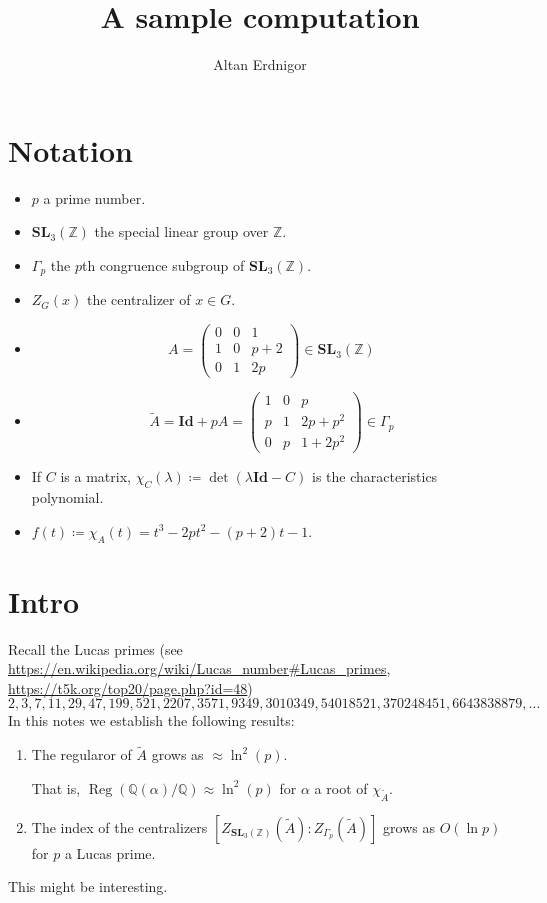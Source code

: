 \documentclass[a4paper]{article}
\DeclareMathOperator{\assign}{\coloneqq}        %
\newcommand{\Q}{\mathbb{Q}}        %
\newcommand{\Id}{\mathbf{Id}}        %
\newcommand{\SL}{\mathbf{SL}_3(\mathbb{Z})}        %
\newcommand{\SLp}{\Gamma_p}        %
\DeclareMathOperator{\Reg}{Reg}        %
\begin{document}
\title{A sample computation}	
\author{Altan Erdnigor}
\maketitle

\section{Notation}
\begin{itemize}
\item $p$ a prime number.
\item $\SL$ the special linear group over $\mathbb{Z}$.
\item $\SLp$ the $p$th congruence subgroup of $\SL$.
\item $Z_G(x)$ the centralizer of $x \in G$.
\item 
\begin{equation}
\label{matrix_small}
A = 
\begin{pmatrix}
0 & 0 & 1 \\
1 & 0 & p+2 \\
0 & 1 & 2p
\end{pmatrix}
\in \SL
\end{equation}
\item 
\begin{equation}
\label{matrix_big}
\tilde A = \Id + p A =
\begin{pmatrix}
1 & 0 & p \\
p & 1 & 2 p + p^2 \\
0 & p & 1 + 2 p^2
\end{pmatrix}
\in \SLp
\end{equation}

\item If $C$ is a matrix, $\chi_C(\lambda) \assign \det(\lambda \Id - C)$ is the characteristics polynomial.
\item $ f(t) \assign \chi_A(t) = t^3 - 2p t^2 - (p + 2) t - 1$.

\end{itemize}

\section{Intro}
Recall the Lucas primes (see \url{https://en.wikipedia.org/wiki/Lucas_number#Lucas_primes}, \url{https://t5k.org/top20/page.php?id=48})
\begin{equation}
	\label{the_primes_sequence}
2, 3, 7, 11, 29, 47, 199, 521, 2207, 3571, 9349, 3010349, 54018521, 370248451, 6643838879, \ldots
\end{equation}
In this notes we establish the following results:
\begin{enumerate}
\item
The regularor of $\tilde A$
grows as $\approx \ln^2(p)$. 

That is, $\Reg ( \Q(\alpha)/\Q ) \approx \ln^2(p) $ for $\alpha$ a root of $\chi_{\tilde A}$.

\item
The index of the centralizers
$ [Z_{\SL}(\tilde A) : Z_{\SLp}(\tilde A)] $
grows as $O(\ln p)$ for $p$ a Lucas prime.
\end{enumerate}
This might be interesting.
\end{document}
